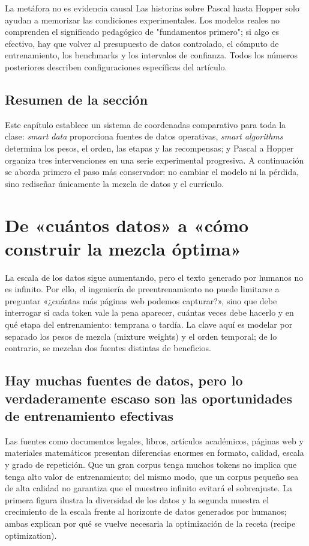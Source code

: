 \documentclass[a4paper]{article}
\begin{document}
\begin{warningbox}{La metáfora no es evidencia causal}
Las historias sobre Pascal hasta Hopper solo ayudan a memorizar las condiciones experimentales. Los modelos reales no comprenden el significado pedagógico de "fundamentos primero"; si algo es efectivo, hay que volver al presupuesto de datos controlado, el cómputo de entrenamiento, los benchmarks y los intervalos de confianza. Todos los números posteriores describen configuraciones específicas del artículo.
\end{warningbox}

\subsection{Resumen de la sección}

Este capítulo establece un sistema de coordenadas comparativo para toda la clase: \textit{smart data} proporciona fuentes de datos operativas, \textit{smart algorithms} determina los pesos, el orden, las etapas y las recompensas; y Pascal a Hopper organiza tres intervenciones en una serie experimental progresiva. A continuación se aborda primero el paso más conservador: no cambiar el modelo ni la pérdida, sino rediseñar únicamente la mezcla de datos y el currículo.
\section{De «cuántos datos» a «cómo construir la mezcla óptima»}

La escala de los datos sigue aumentando, pero el texto generado por humanos no es infinito. Por ello, el ingeniería de preentrenamiento no puede limitarse a preguntar «¿cuántas más páginas web podemos capturar?», sino que debe interrogar si cada token vale la pena aparecer, cuántas veces debe hacerlo y en qué etapa del entrenamiento: temprana o tardía. La clave aquí es modelar por separado los pesos de mezcla (mixture weights) y el orden temporal; de lo contrario, se mezclan dos fuentes distintas de beneficios.

\subsection{Hay muchas fuentes de datos, pero lo verdaderamente escaso son las oportunidades de entrenamiento efectivas}

Las fuentes como documentos legales, libros, artículos académicos, páginas web y materiales matemáticos presentan diferencias enormes en formato, calidad, escala y grado de repetición. Que un gran corpus tenga muchos tokens no implica que tenga alto valor de entrenamiento; del mismo modo, que un corpus pequeño sea de alta calidad no garantiza que el muestreo infinito evitará el sobreajuste. La primera figura ilustra la diversidad de los datos y la segunda muestra el crecimiento de la escala frente al horizonte de datos generados por humanos; ambas explican por qué se vuelve necesaria la optimización de la receta (recipe optimization).
\end{document}
